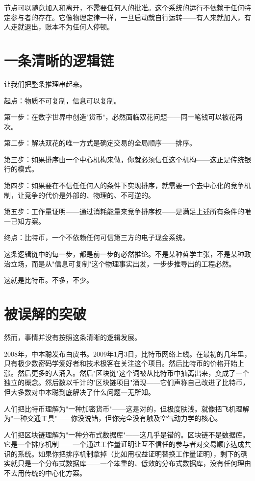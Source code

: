 \documentclass[a4paper,12pt,openany]{ctexbook}
\begin{document}
节点可以随意加入和离开，不需要任何人的批准。这个系统的运行不依赖于任何特定参与者的存在。它像物理定律一样，一旦启动就自行运转——有人来就加入，有人走就退出，账本不为任何人停顿。


\section*{一条清晰的逻辑链}


让我们把整条推理串起来。

起点：物质不可复制，信息可以复制。

第一步：在数字世界中创造"货币"，必然面临双花问题——同一笔钱可以被花两次。

第二步：解决双花的唯一方式是确定交易的全局顺序——排序。

第三步：如果排序由一个中心机构来做，你就必须信任这个机构——这正是传统银行的模式。

第四步：如果要在不信任任何人的条件下实现排序，就需要一个去中心化的竞争机制，让竞争的代价是外部的、物理的、不可逆的。

第五步：工作量证明——通过消耗能量来竞争排序权——是满足上述所有条件的唯一已知方案。

终点：比特币，一个不依赖任何可信第三方的电子现金系统。

这条逻辑链中的每一步，都是前一步的必然推论。不是某种哲学主张，不是某种政治立场，而是从"信息可复制"这个物理事实出发，一步步推导出的工程必然。

这就是比特币。不多，不少。


\section*{被误解的突破}


然而，事情并没有按照这条清晰的逻辑发展。

2008年，中本聪发布白皮书。2009年1月3日，比特币网络上线。在最初的几年里，只有极少数密码学爱好者和技术极客在关注这个项目。然后比特币的价格开始上涨。然后更多的人涌入。然后"区块链"这个词被从比特币中抽离出来，变成了一个独立的概念。然后数以千计的"区块链项目"涌现——它们声称自己改进了比特币，但大多数对中本聪到底解决了什么问题一无所知。

人们把比特币理解为"一种加密货币"——这是对的，但极度肤浅。就像把飞机理解为"一种交通工具"——你没说错，但你完全没有触及空气动力学的核心。

人们把区块链理解为"一种分布式数据库"——这几乎是错的。区块链不是数据库。它是一个排序机制——一个通过工作量证明让互不信任的参与者对交易顺序达成共识的系统。如果你把排序机制拿掉（比如用权益证明替换工作量证明），剩下的确实就只是一个分布式数据库——一个笨重的、低效的分布式数据库，没有任何理由不去用传统的中心化方案。
\end{document}
